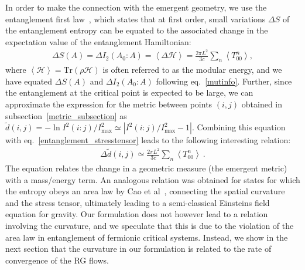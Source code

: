 In order to make the connection with the emergent geometry, we use the entanglement first law~\cite{Blanco2013}, which states that at first order, small variations \(\Delta S\) of the entanglement entropy can be equated to the associated change in the expectation value of the entanglement Hamiltonian:
\begin{equation}\begin{aligned}
	\label{entanglement_stresstensor}
	\Delta S(A) = \Delta I_2(A_0:A) = \left<\Delta \mathcal{H} \right> = \frac{2\pi L^2}{3c}\sum_n \left<T^n_{00}\right>,
\end{aligned}\end{equation}
where \(\left<\mathcal{H}\right>=\text{Tr}\left( \rho \mathcal{H} \right) \) is often referred to as the modular energy, and we have equated \(\Delta S(A)\) and \(\Delta I_2(A_0:A)\) following eq.~\eqref{mutinfo}. Further, since the entanglement at the critical point is expected to be large, we can approximate the expression for the metric between points \((i,j)\) obtained in subsection~\ref{metric_subsection} as \(\tilde d(i,j)  = -\ln I^2(i:j)/I^2_\text{max} \simeq |I^2(i:j)/I^2_\text{max} - 1|\). Combining this equation with eq.~\eqref{entanglement_stresstensor} leads to the following interesting relation:
\begin{equation}\begin{aligned}
	\Delta \tilde d(i,j) \simeq \frac{2\pi L^2}{3c}\sum_n \left<T^n_{00}\right>~.
\end{aligned}\end{equation}
The equation relates the change in a geometric measure (the emergent metric) with a mass/energy term. An analogous relation was obtained for states for which the entropy obeys an area law by Cao et al~\cite{cao_2017}, connecting the spatial curvature and the stress tensor, ultimately leading to a semi-classical Einsteins field equation for gravity. Our formulation does not however lead to a relation involving the curvature, and we speculate that this is due to the violation of the area law in entanglement of fermionic critical systems. Instead, we show in the next section that the curvature in our formulation is related to the rate of convergence of the RG flows.

